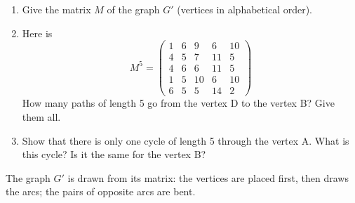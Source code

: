 \begin{enumerate}
   \begin{enumerate}
   \item Give the matrix $M$ of the graph $G'$ (vertices in alphabetical
         order).
   \item Here is
\[M^5 =
\begin{pmatrix}
1 & 6 &  9 &  6 & 10\\
4 & 5 &  7 & 11 &  5\\
4 & 6 &  6 & 11 &  5\\
1 & 5 & 10 &  6 & 10\\
6 & 5 &  5 & 14 &  2
\end{pmatrix}\]
         How many paths of length 5 go from the vertex D to the vertex B?
         Give them all.
   \item Show that there is only one cycle of length 5 through the vertex
         A. What is this cycle? Is it the same for the vertex B?
   \end{enumerate}
\end{enumerate}

The graph $G'$ is drawn from its matrix: the vertices are placed first, then
 draws the arcs; the
pairs of opposite arcs are bent.

\begin{tkzexample}
\end{tkzexample}

\endinput
